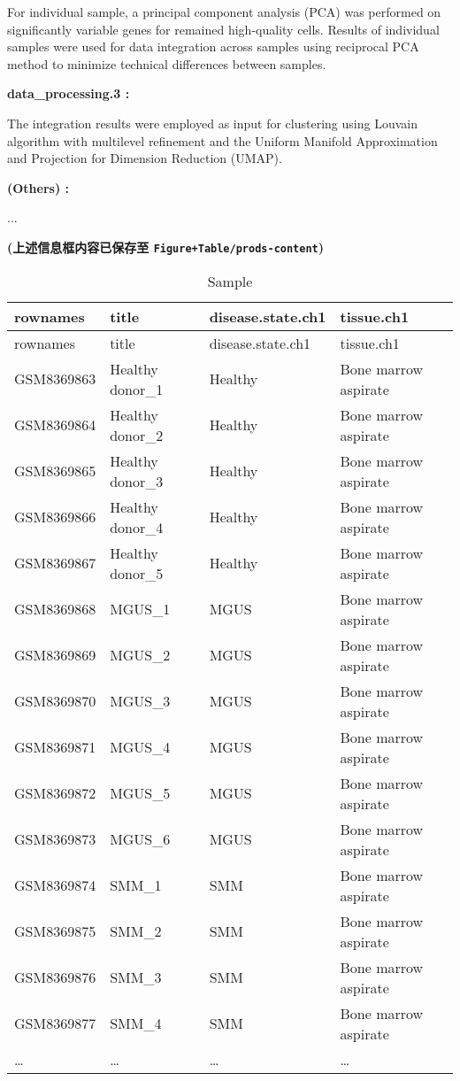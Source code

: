 \documentclass[
]{article}
\begin{document}
\begin{center}
\begin{tcolorbox}[colback=gray!10, colframe=gray!50, width=0.9\linewidth, arc=1mm, boxrule=0.5pt]
    For individual sample, a principal component analysis
(PCA) was performed on significantly variable genes for
remained high-quality cells. Results of individual samples
were used for data integration across samples using
reciprocal PCA method to minimize technical differences
between samples.

\vspace{2em}


\textbf{
data\_processing.3
:}

\vspace{0.5em}

    The integration results were employed as input for
clustering using Louvain algorithm with multilevel
refinement and the Uniform Manifold Approximation and
Projection for Dimension Reduction (UMAP).

\vspace{2em}


\textbf{
(Others)
:}

\vspace{0.5em}

    ...

\vspace{2em}
\end{tcolorbox}
\end{center}

\textbf{(上述信息框内容已保存至 \texttt{Figure+Table/prods-content})}

\begin{center}\vspace{1.5cm}\end{center}

\begin{longtable}[]{@{}llll@{}}
\caption{\label{tab:sample}Sample}\tabularnewline
\toprule
rownames & title & disease.state.ch1 & tissue.ch1\tabularnewline
\midrule
\endfirsthead
\toprule
rownames & title & disease.state.ch1 & tissue.ch1\tabularnewline
\midrule
\endhead
GSM8369863 & Healthy donor\_1 & Healthy & Bone marrow aspirate\tabularnewline
GSM8369864 & Healthy donor\_2 & Healthy & Bone marrow aspirate\tabularnewline
GSM8369865 & Healthy donor\_3 & Healthy & Bone marrow aspirate\tabularnewline
GSM8369866 & Healthy donor\_4 & Healthy & Bone marrow aspirate\tabularnewline
GSM8369867 & Healthy donor\_5 & Healthy & Bone marrow aspirate\tabularnewline
GSM8369868 & MGUS\_1 & MGUS & Bone marrow aspirate\tabularnewline
GSM8369869 & MGUS\_2 & MGUS & Bone marrow aspirate\tabularnewline
GSM8369870 & MGUS\_3 & MGUS & Bone marrow aspirate\tabularnewline
GSM8369871 & MGUS\_4 & MGUS & Bone marrow aspirate\tabularnewline
GSM8369872 & MGUS\_5 & MGUS & Bone marrow aspirate\tabularnewline
GSM8369873 & MGUS\_6 & MGUS & Bone marrow aspirate\tabularnewline
GSM8369874 & SMM\_1 & SMM & Bone marrow aspirate\tabularnewline
GSM8369875 & SMM\_2 & SMM & Bone marrow aspirate\tabularnewline
GSM8369876 & SMM\_3 & SMM & Bone marrow aspirate\tabularnewline
GSM8369877 & SMM\_4 & SMM & Bone marrow aspirate\tabularnewline
\ldots{} & \ldots{} & \ldots{} & \ldots{}\tabularnewline
\bottomrule
\end{longtable}
\end{document}
